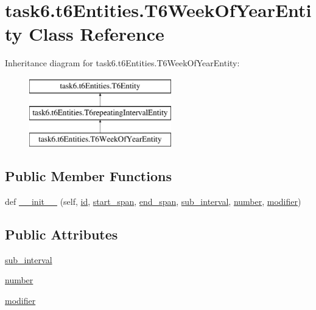 \hypertarget{classtask6_1_1t6Entities_1_1T6WeekOfYearEntity}{}\section{task6.\+t6\+Entities.\+T6\+Week\+Of\+Year\+Entity Class Reference}
\label{classtask6_1_1t6Entities_1_1T6WeekOfYearEntity}
Inheritance diagram for task6.\+t6\+Entities.\+T6\+Week\+Of\+Year\+Entity\+:\begin{figure}[H]
\begin{center}
\leavevmode
\includegraphics[height=3.000000cm]{classtask6_1_1t6Entities_1_1T6WeekOfYearEntity}
\end{center}
\end{figure}
\subsection*{Public Member Functions}
\begin{DoxyCompactItemize}
\item 
def \hyperlink{classtask6_1_1t6Entities_1_1T6WeekOfYearEntity_a383f784d6fe9b9d9cb7748b192f2cfc8}{\+\_\+\+\_\+init\+\_\+\+\_\+} (self, \hyperlink{classtask6_1_1t6Entities_1_1T6Entity_afeeced8134bb3ebe0cfecc64d0ab46a4}{id}, \hyperlink{classtask6_1_1t6Entities_1_1T6Entity_a52779e9af8864dc98e8b02fc5b9b041a}{start\+\_\+span}, \hyperlink{classtask6_1_1t6Entities_1_1T6Entity_aeb402200b156cd9562c5111dfe777b98}{end\+\_\+span}, \hyperlink{classtask6_1_1t6Entities_1_1T6WeekOfYearEntity_a4174bf8c3d14fa8c625130a7108d2d2d}{sub\+\_\+interval}, \hyperlink{classtask6_1_1t6Entities_1_1T6WeekOfYearEntity_a1fc34a92a9053036d2885b4a84e6eae6}{number}, \hyperlink{classtask6_1_1t6Entities_1_1T6WeekOfYearEntity_a98237ac4ba6e2aab8c0ae582452f3839}{modifier})
\end{DoxyCompactItemize}
\subsection*{Public Attributes}
\begin{DoxyCompactItemize}
\item 
\hyperlink{classtask6_1_1t6Entities_1_1T6WeekOfYearEntity_a4174bf8c3d14fa8c625130a7108d2d2d}{sub\+\_\+interval}
\item 
\hyperlink{classtask6_1_1t6Entities_1_1T6WeekOfYearEntity_a1fc34a92a9053036d2885b4a84e6eae6}{number}
\item 
\hyperlink{classtask6_1_1t6Entities_1_1T6WeekOfYearEntity_a98237ac4ba6e2aab8c0ae582452f3839}{modifier}
\end{DoxyCompactItemize}


